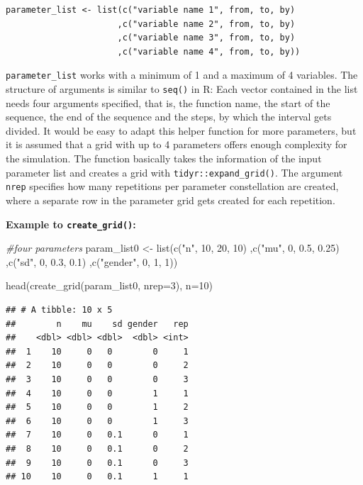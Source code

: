 \documentclass[11pt,a4paper]{article}
\newenvironment{Shaded}{\begin{snugshade}}{\end{snugshade}}
\newcommand{\AttributeTok}[1]{\textcolor[rgb]{0.77,0.63,0.00}{#1}}
\newcommand{\CommentTok}[1]{\textcolor[rgb]{0.56,0.35,0.01}{\textit{#1}}}
\newcommand{\DecValTok}[1]{\textcolor[rgb]{0.00,0.00,0.81}{#1}}
\newcommand{\FloatTok}[1]{\textcolor[rgb]{0.00,0.00,0.81}{#1}}
\newcommand{\FunctionTok}[1]{\textcolor[rgb]{0.00,0.00,0.00}{#1}}
\newcommand{\NormalTok}[1]{#1}
\newcommand{\OtherTok}[1]{\textcolor[rgb]{0.56,0.35,0.01}{#1}}
\newcommand{\StringTok}[1]{\textcolor[rgb]{0.31,0.60,0.02}{#1}}
\begin{document}
\begin{verbatim}
parameter_list <- list(c("variable name 1", from, to, by) 
                      ,c("variable name 2", from, to, by)
                      ,c("variable name 3", from, to, by)
                      ,c("variable name 4", from, to, by))
\end{verbatim}

\texttt{parameter\_list} works with a minimum of 1 and a maximum of 4
variables. The structure of arguments is similar to \texttt{seq()} in R:
Each vector contained in the list needs four arguments specified, that
is, the function name, the start of the sequence, the end of the
sequence and the steps, by which the interval gets divided. It would be
easy to adapt this helper function for more parameters, but it is
assumed that a grid with up to 4 parameters offers enough complexity for
the simulation. The function basically takes the information of the
input parameter list and creates a grid with
\texttt{tidyr::expand\_grid()}. The argument \texttt{nrep} specifies how
many repetitions per parameter constellation are created, where a
separate row in the parameter grid gets created for each repetition.

\textbf{Example to \texttt{create\_grid()}:}

\begin{Shaded}
\begin{Highlighting}[]
\CommentTok{\#four parameters }
\NormalTok{param\_list0 }\OtherTok{\textless{}{-}} \FunctionTok{list}\NormalTok{(}\FunctionTok{c}\NormalTok{(}\StringTok{"n"}\NormalTok{, }\DecValTok{10}\NormalTok{, }\DecValTok{20}\NormalTok{, }\DecValTok{10}\NormalTok{)}
\NormalTok{                    ,}\FunctionTok{c}\NormalTok{(}\StringTok{"mu"}\NormalTok{, }\DecValTok{0}\NormalTok{, }\FloatTok{0.5}\NormalTok{, }\FloatTok{0.25}\NormalTok{)}
\NormalTok{                    ,}\FunctionTok{c}\NormalTok{(}\StringTok{"sd"}\NormalTok{, }\DecValTok{0}\NormalTok{, }\FloatTok{0.3}\NormalTok{, }\FloatTok{0.1}\NormalTok{)}
\NormalTok{                    ,}\FunctionTok{c}\NormalTok{(}\StringTok{"gender"}\NormalTok{, }\DecValTok{0}\NormalTok{, }\DecValTok{1}\NormalTok{, }\DecValTok{1}\NormalTok{))}

\FunctionTok{head}\NormalTok{(}\FunctionTok{create\_grid}\NormalTok{(param\_list0, }\AttributeTok{nrep=}\DecValTok{3}\NormalTok{), }\AttributeTok{n=}\DecValTok{10}\NormalTok{)}
\end{Highlighting}
\end{Shaded}

\begin{verbatim}
## # A tibble: 10 x 5
##        n    mu    sd gender   rep
##    <dbl> <dbl> <dbl>  <dbl> <int>
##  1    10     0   0        0     1
##  2    10     0   0        0     2
##  3    10     0   0        0     3
##  4    10     0   0        1     1
##  5    10     0   0        1     2
##  6    10     0   0        1     3
##  7    10     0   0.1      0     1
##  8    10     0   0.1      0     2
##  9    10     0   0.1      0     3
## 10    10     0   0.1      1     1
\end{verbatim}
\end{document}

